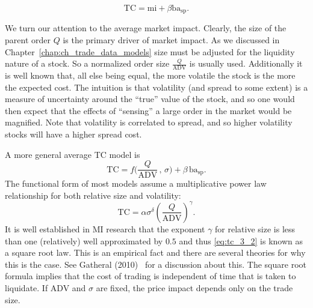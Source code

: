        \begin{equation}\label{eq:tc_3}
        \text{TC}= \text{mi} + \beta \text{ba}_{\text{sp}}.
        \end{equation}


We turn our attention to the average market impact. Clearly, the size of the parent order $Q$ is the primary driver of market impact. As we discussed in Chapter~\ref{chap:ch_trade_data_models} size must be adjusted for the liquidity nature of a stock. So a normalized order size $\frac{Q}{\text{ADV}}$ is usually used. Additionally it is well known that, all else being equal, the more volatile the stock is the more the expected cost. The intuition is that volatility (and spread to some extent) is a measure of  uncertainty around the ``true'' value of the stock, and so one would then expect that the effects of ``sensing'' a large order in the market would be magnified. Note that volatility is correlated to spread, and so higher volatility stocks will have a higher spread cost.


A more general average TC model is
        \begin{equation} \label{eq:tc_3}
        	\text{TC}= f \big(\frac{Q}{\text{ADV}}\,,\, \sigma \big) + \beta \,\text{ba}_{\text{sp}}.
        \end{equation}
The functional form of most models assume a multiplicative power law relationship for both relative size and volatility:
        \begin{equation} \label{eq:tc_3_2}
	\text{TC}=\alpha  \sigma^{\delta} \left( \frac{Q}{\text{ADV}} \right)^{\gamma}.
        \end{equation}
It is well established in MI research that the exponent $\gamma$ for relative size is less than one (relatively) well approximated by $0.5$ and thus \eqref{eq:tc_3_2} is known as a square root law. This is an empirical fact and there are several theories for why this is the case. See Gatheral (2010)~\cite{gatheral} for a discussion about this. The square root formula implies that the cost of trading is independent of time that is taken to liquidate. If ADV and $\sigma$ are fixed, the price impact depends only on the trade size. 


